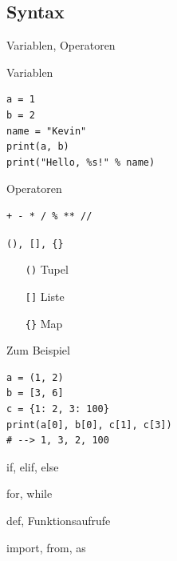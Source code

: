 \subsection{Syntax}
\begin{frame}[fragile]{Variablen, Operatoren}
  \begin{exampleblock}{Variablen}
    \begin{verbatim}
a = 1
b = 2
name = "Kevin"
print(a, b)
print("Hello, %s!" % name)
    \end{verbatim}
  \end{exampleblock}
  \begin{exampleblock}{Operatoren}
  \begin{verbatim}
+ - * / % ** //
  \end{verbatim}
  \end{exampleblock}
\end{frame}

\begin{frame}[fragile]{\texttt{(), [], \{\}}}
  \begin{itemize}
    \item[\texttt{()}] Tupel
    \item[\texttt{[]}] Liste
    \item[\texttt{\{\}}] Map 
  \end{itemize}
  \vspace{.5em}
  \begin{spacing}{1.0}
    \begin{exampleblock}{Zum Beispiel}
      \begin{verbatim}
a = (1, 2)
b = [3, 6]
c = {1: 2, 3: 100}
print(a[0], b[0], c[1], c[3])
# --> 1, 3, 2, 100
      \end{verbatim}
    \end{exampleblock}
  \end{spacing}
\end{frame}

\begin{frame}{if, elif, else}
\end{frame}

\begin{frame}{for, while}
\end{frame}

\begin{frame}{def, Funktionsaufrufe}
\end{frame}

\begin{frame}{import, from, as}
\end{frame}

